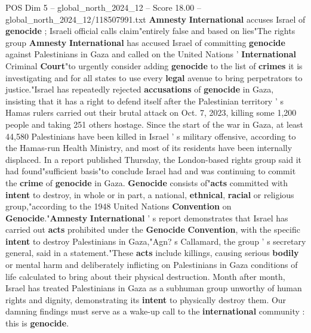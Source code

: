 \begin{textsample}{POS Dim 5 – global\_north\_2024\_12 – Score 18.00 – global\_north\_2024\_12/118507991.txt}  \label{ex:f5_pos_126}
\textbf{Amnesty} \textbf{International} accuses Israel of \textbf{genocide} ; Israeli official calls claim"entirely false and based on lies"The rights group \textbf{Amnesty} \textbf{International} has accused Israel of committing \textbf{genocide} against Palestinians in Gaza and called on the United Nations ' \textbf{International} Criminal \textbf{Court}"to urgently consider adding \textbf{genocide} to the list of \textbf{crimes} it is investigating and for all states to use every \textbf{legal} avenue to bring perpetrators to justice."Israel has repeatedly rejected \textbf{accusations} of \textbf{genocide} in Gaza, insisting that it has a right to defend itself after the Palestinian territory ' s Hamas rulers carried out their brutal attack on Oct. 7, 2023, killing some 1,200 people and taking 251 others hostage.
Since the start of the war in Gaza, at least 44,580 Palestinians have been killed in Israel ' s military offensive, according to the Hamas-run Health Ministry, and most of its residents have been internally displaced.
In a report published Thursday, the London-based rights group said it had found"sufficient basis"to conclude Israel had and was continuing to commit the \textbf{crime} of \textbf{genocide} in Gaza. \textbf{Genocide} consists of"\textbf{acts} committed with \textbf{intent} to destroy, in whole or in part, a national, \textbf{ethnical}, \textbf{racial} or religious group,"according to the 1948 United Nations \textbf{Convention} on \textbf{Genocide}."\textbf{Amnesty} \textbf{International} ' s report demonstrates that Israel has carried out \textbf{acts} prohibited under the \textbf{Genocide} \textbf{Convention}, with the specific \textbf{intent} to destroy Palestinians in Gaza,"Agn? s Callamard, the group ' s secretary general, said in a statement."These \textbf{acts} include killings, causing serious \textbf{bodily} or mental harm and deliberately inflicting on Palestinians in Gaza conditions of life calculated to bring about their physical destruction.
Month after month, Israel has treated Palestinians in Gaza as a subhuman group unworthy of human rights and dignity, demonstrating its \textbf{intent} to physically destroy them.
Our damning findings must serve as a wake-up call to the \textbf{international} community : this is \textbf{genocide}.

\end{textsample}
